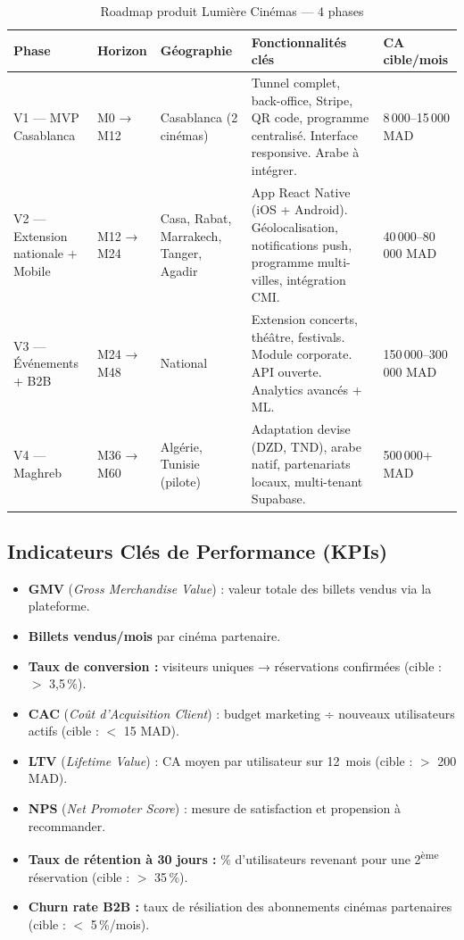 \documentclass[12pt,a4paper,openany]{report}
\begin{document}
\begin{table}[H]
\centering
\small
\begin{tabularx}{\textwidth}{p{2.8cm}p{1.8cm}p{2.4cm}Xp{2.4cm}}
\toprule
\textbf{Phase} & \textbf{Horizon} & \textbf{Géographie} & \textbf{Fonctionnalités clés} & \textbf{CA cible/mois} \\
\midrule
V1 — MVP Casablanca & M0 → M12 & Casablanca (2 cinémas) & Tunnel complet, back-office, Stripe, QR code, programme centralisé. Interface responsive. Arabe à intégrer. & 8\,000–15\,000 MAD \\
\midrule
V2 — Extension nationale + Mobile & M12 → M24 & Casa, Rabat, Marrakech, Tanger, Agadir & App React Native (iOS + Android). Géolocalisation, notifications push, programme multi-villes, intégration CMI. & 40\,000–80\,000 MAD \\
\midrule
V3 — Événements + B2B & M24 → M48 & National & Extension concerts, théâtre, festivals. Module corporate. API ouverte. Analytics avancés + ML. & 150\,000–300\,000 MAD \\
\midrule
V4 — Maghreb & M36 → M60 & Algérie, Tunisie (pilote) & Adaptation devise (DZD, TND), arabe natif, partenariats locaux, multi-tenant Supabase. & 500\,000+ MAD \\
\bottomrule
\end{tabularx}
\caption{Roadmap produit Lumière Cinémas — 4 phases}
\label{tab:roadmap}
\end{table}

\subsection{Indicateurs Clés de Performance (KPIs)}

\begin{itemize}
  \item \textbf{GMV} (\textit{Gross Merchandise Value}) : valeur totale des billets vendus via la plateforme.
  \item \textbf{Billets vendus/mois} par cinéma partenaire.
  \item \textbf{Taux de conversion :} visiteurs uniques → réservations confirmées (cible : $>$ 3,5\,\%).
  \item \textbf{CAC} (\textit{Coût d'Acquisition Client}) : budget marketing ÷ nouveaux utilisateurs actifs (cible : $<$ 15 MAD).
  \item \textbf{LTV} (\textit{Lifetime Value}) : CA moyen par utilisateur sur 12~mois (cible : $>$ 200 MAD).
  \item \textbf{NPS} (\textit{Net Promoter Score}) : mesure de satisfaction et propension à recommander.
  \item \textbf{Taux de rétention à 30 jours :} \% d'utilisateurs revenant pour une 2\textsuperscript{ème} réservation (cible : $>$ 35\,\%).
  \item \textbf{Churn rate B2B :} taux de résiliation des abonnements cinémas partenaires (cible : $<$ 5\,\%/mois).
\end{itemize}
\end{document}
